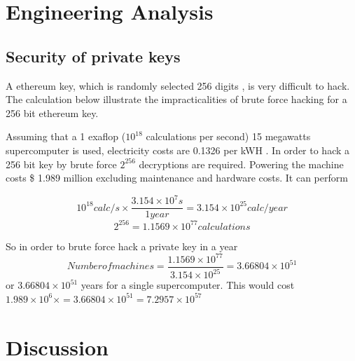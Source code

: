 \documentclass[12pt]{scrreprt}
\begin{document}
\chapter{Engineering Analysis}

\section{Security of private keys}
A ethereum key, which is randomly selected 256 digits \cite{ethereumWhitePaper:Online}, is very difficult to hack. The calculation below illustrate the impracticalities of brute force hacking for a 256 bit ethereum key.





Assuming that a 1 exaflop ($10^{18}$ calculations per second) 15 megawatts supercomputer \cite{Service617} is used, electricity costs are 0.1326 per kWH \cite{BCHydroRates}. In order to hack a 256 bit key by brute force $2^{256}$ decryptions are required. Powering the machine costs \$ 1.989 million excluding maintenance and hardware costs. It can perform

\[
10^{18} calc/s \times \frac{3.154 \times 10^7 s}{1 year} = 3.154 \times 10^{25} calc/year
\]
\[
2^{256} = 1.1569 \times 10^{77} calculations
\]

So in order to brute force hack a private key in a year 
\[
Number of machines = \frac{1.1569 \times 10^{77}}{3.154 \times 10^25}= 3.66804 \times 10^{51}
\]
or $3.66804 \times 10^{51}$ years for a single supercomputer. This would cost $1.989 \times 10^6 \times =3.66804 \times 10^{51}=7.2957 \times 10^{57}$
 
\chapter{Discussion}
\end{document}
